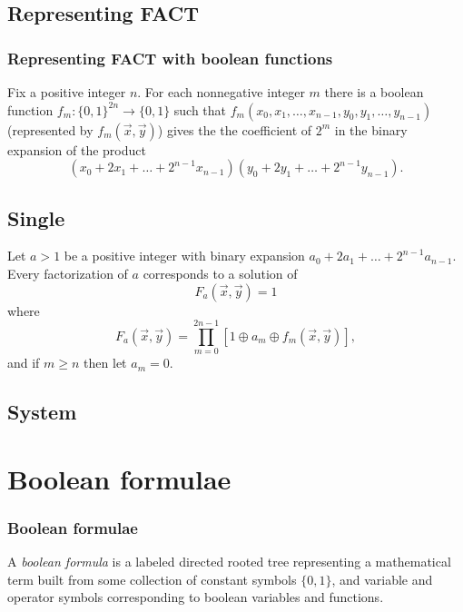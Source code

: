 \documentclass{beamer}
\begin{document}
\subsection[Representing FACT]{Representing FACT}
\begin{frame}
\frametitle{Representing FACT with boolean functions}
Fix a positive integer $n$. For each nonnegative integer $m$ there is a boolean function $f_m : \{0,1\}^{2n} \to \{0,1\}$ such that $f_m(x_0,x_1,\dots,x_{n-1},y_0,y_1,\dots,y_{n-1})$ (represented by $f_m(\vec{x},\vec{y})$) gives the the coefficient of $2^m$ in the binary expansion of the product
$$(x_0 + 2x_1 + \dots + 2^{n-1}x_{n-1})(y_0 + 2y_1 + \dots + 2^{n-1}y_{n-1}).$$
\end{frame}

\subsection[Single]{Single}
\begin{frame}
Let $a>1$ be a positive integer with binary expansion $a_0 + 2a_1 + \dots + 2^{n-1}a_{n-1}$. Every factorization of $a$ corresponds to a solution of
$$F_a(\vec{x},\vec{y}) = 1$$
where
$$F_a(\vec{x},\vec{y}) = \prod_{m=0}^{2n-1}[1 \oplus a_m \oplus f_m(\vec{x},\vec{y})],$$
and if $m \geq n$ then let $a_m=0.$
\end{frame}

\subsection[System]{System}

\section[Boolean formulae]{Boolean formulae}
\begin{frame}
\frametitle{Boolean formulae}
A \textit{boolean formula} is a labeled directed rooted tree representing a mathematical term built from some collection of constant symbols $\{0,1\}$, and variable and operator symbols corresponding to boolean variables and functions.
\end{frame}
\end{document}
